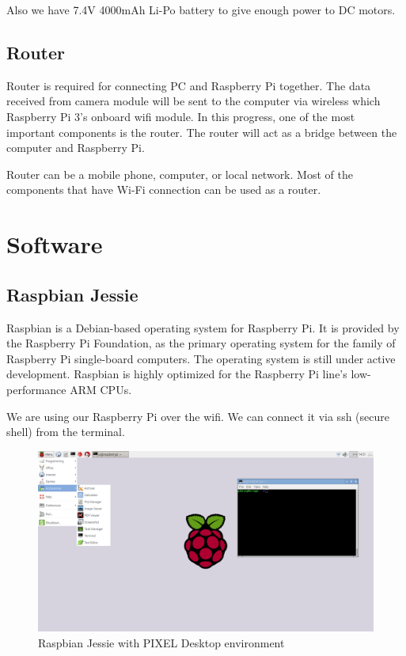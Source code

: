 \documentclass[12pt,a4paper]{article}
\begin{document}
Also we have 7.4V 4000mAh Li-Po battery to give enough power to DC motors.

\subsection{Router}
Router is required for connecting PC and Raspberry Pi together. The data received from camera module will be sent to the computer via wireless 
which Raspberry Pi 3's onboard wifi module. In this progress, one of the most important components is the router. The router will act as a bridge 
between the computer and Raspberry Pi.

Router can be a mobile phone, computer, or local network. Most of the components that have Wi-Fi connection can be used as a router.

\section{Software}
\subsection{Raspbian Jessie}
Raspbian is a Debian-based operating system for Raspberry Pi. It is provided by the Raspberry Pi Foundation, as the primary operating system 
for the family of Raspberry Pi single-board computers. The operating system is still under active development. Raspbian is highly optimized 
for the Raspberry Pi line's low-performance ARM CPUs.

We are using our Raspberry Pi over the wifi. We can connect it via ssh (secure shell) from the terminal.
\begin{figure}[h!]
  \begin{center}
    \includegraphics[scale=0.2]{raspbian}
    \caption{Raspbian Jessie with PIXEL Desktop environment}
  \end{center}
\end{figure}
\end{document}
